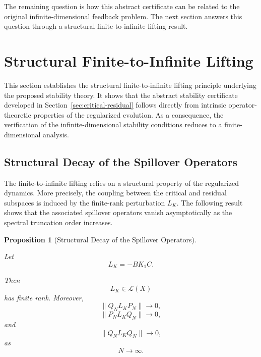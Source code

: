 \documentclass[pdflatex,sn-mathphys-num]{sn-jnl}
\theoremstyle{thmstyleone}%
\newtheorem{proposition}[theorem]{Proposition}%
\theoremstyle{thmstyletwo}%
\theoremstyle{thmstylethree}%
\begin{document}
The remaining question is how this abstract certificate can be related to the original infinite-dimensional feedback problem. The next section answers this question through a structural finite-to-infinite lifting result.

\section{Structural Finite-to-Infinite Lifting}
\label{sec:structural-lifting}

This section establishes the structural finite-to-infinite lifting principle underlying the proposed stability theory. It shows that the abstract stability certificate developed in Section~\ref{sec:critical-residual} follows directly from intrinsic operator-theoretic properties of the regularized evolution. As a consequence, the verification of the infinite-dimensional stability conditions reduces to a finite-dimensional analysis.

\subsection{Structural Decay of the Spillover Operators}
\label{subsec:structural-spillover}

The finite-to-infinite lifting relies on a structural property of the regularized dynamics. More precisely, the coupling between the critical and residual subspaces is induced by the finite-rank perturbation \(L_K\). The following result shows that the associated spillover operators vanish asymptotically as the spectral truncation order increases.

\begin{proposition}[Structural Decay of the Spillover Operators]
\label{prop:structural-spillover}

Let
\[
L_K=-BK_1C.
\]

Then
\[
L_K\in\mathcal L(X)
\]
has finite rank. Moreover,
\begin{equation}
\|Q_NL_KP_N\|
\longrightarrow0,
\label{eq:QNLPN-decay}
\end{equation}
\begin{equation}
\|P_NL_KQ_N\|
\longrightarrow0,
\label{eq:PNLQN-decay}
\end{equation}
and
\begin{equation}
\|Q_NL_KQ_N\|
\longrightarrow0,
\label{eq:QNLQN-decay}
\end{equation}
as
\[
N\rightarrow\infty.
\]

\end{proposition}
\end{document}
